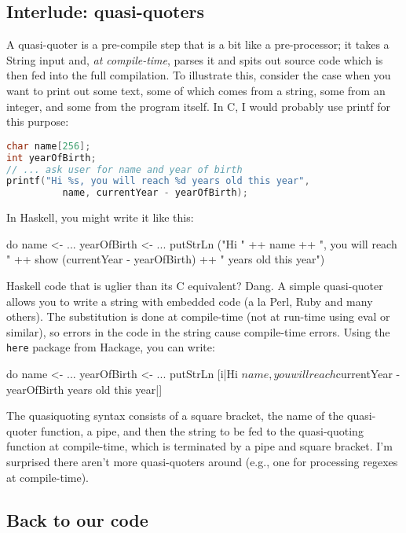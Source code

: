 \documentclass{tmr}
\begin{document}
\subsection{Interlude: quasi-quoters}

A quasi-quoter is a pre-compile step that is a bit like a pre-processor; it takes a String input and, \textit{at compile-time}, parses it and spits out source code which is then fed into the full compilation.  To illustrate this, consider the case when you want to print out some text, some of which comes from a string, some from an integer, and some from the program itself.  In C, I would probably use printf for this purpose:

\begin{lstlisting}[language=C]
char name[256];
int yearOfBirth;
// ... ask user for name and year of birth
printf("Hi %s, you will reach %d years old this year",
          name, currentYear - yearOfBirth);
\end{lstlisting}

In Haskell, you might write it like this:

\begin{code}
do name <- ...
   yearOfBirth <- ...
   putStrLn ("Hi " ++ name ++ ", you will reach " ++
     show (currentYear - yearOfBirth) ++ " years old this year")
\end{code}

Haskell code that is uglier than its C equivalent?  Dang.  A simple quasi-quoter allows you to write a string with embedded code (a la Perl, Ruby and many others).  The substitution is done at compile-time (not at run-time using eval or similar), so errors in the code in the string cause compile-time errors.  Using the \texttt{here} package from Hackage, you can write:

\begin{code}
do name <- ...
   yearOfBirth <- ...
   putStrLn [i|Hi ${name}, you will reach ${currentYear - yearOfBirth}
     years old this year|]
\end{code}

The quasiquoting syntax consists of a square bracket, the name of the quasi-quoter function, a pipe, and then the string to be fed to the quasi-quoting function at compile-time, which is terminated by a pipe and square bracket.  I'm surprised there aren't more quasi-quoters around (e.g., one for processing regexes at compile-time).

\subsection{Back to our code}
\end{document}
